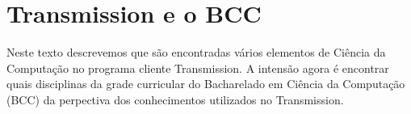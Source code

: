 
\chapter{Transmission e o BCC}

Neste texto descrevemos que são encontradas vários elementos de Ciência da Computação no
programa cliente Transmission. A intensão agora é encontrar quais disciplinas da grade
curricular do Bacharelado em Ciência da Computação (BCC) da perpectiva dos conhecimentos
utilizados no Transmission.

\afterpage{\clearpage}